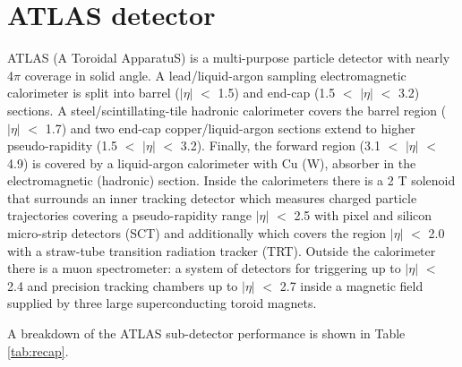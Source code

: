 \documentclass[UKenglish,texlive=2013]{\ATLASLATEXPATH atlasdoc}
\begin{document}
\section{ATLAS detector}
\label{sec:detector}

ATLAS (A Toroidal ApparatuS) is a multi-purpose particle detector with nearly 4$\pi$ coverage in solid angle. A lead/liquid-argon
sampling electromagnetic calorimeter is split into barrel ($|\eta|$ $<$ 1.5) and end-cap (1.5 $<$ $|\eta|$ $<$ 3.2) sections.
A steel/scintillating-tile hadronic calorimeter covers the barrel region ($|\eta|$ $<$ 1.7) and two end-cap
copper/liquid-argon sections extend to higher pseudo-rapidity (1.5 $<$ $|\eta|$ $<$ 3.2). Finally, the forward
region (3.1 $<$ $|\eta|$ $<$ 4.9) is covered by a liquid-argon calorimeter with Cu (W), absorber in the electromagnetic (hadronic) section.
Inside the calorimeters there is a 2 T solenoid that surrounds an inner tracking detector which measures charged particle trajectories covering a pseudo-rapidity range $|\eta|$ $<$ 2.5 with pixel and silicon micro-strip detectors
(SCT) and additionally which covers the region $|\eta|$ $<$ 2.0 with a straw-tube transition radiation tracker (TRT).
Outside the calorimeter there is a muon spectrometer: a system of detectors for triggering up to $|\eta|$ $<$ 2.4 and
precision tracking chambers up to $|\eta|$ $<$ 2.7 inside a magnetic field supplied by three large superconducting toroid magnets.

A breakdown of the ATLAS sub-detector performance is shown in Table \ref{tab:recap}.
\end{document}
